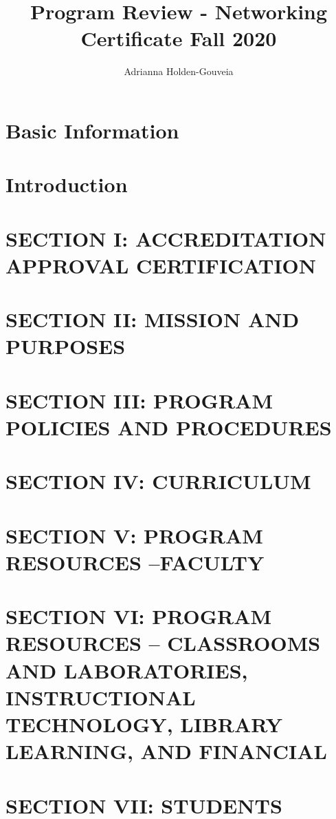 \documentclass[12pt,a4paper,man,natbib,donotrepeattitle, book]{apa6}
\title{Program Review - Networking Certificate Fall 2020}
\author{Adrianna Holden-Gouveia}
\affiliation{Northern Essex Community College}
\begin{document}
\maketitle
\doublespacing
\tableofcontents

\newpage
\section{Basic Information}



\section{Introduction}


\section{SECTION I: ACCREDITATION APPROVAL CERTIFICATION}
%

\section{SECTION II: MISSION AND PURPOSES}
%

\section{SECTION III: PROGRAM POLICIES AND PROCEDURES}
%

\section{SECTION IV: CURRICULUM}
%

\section{SECTION V: PROGRAM RESOURCES –FACULTY}
%

\section{SECTION VI: PROGRAM RESOURCES – CLASSROOMS AND LABORATORIES, INSTRUCTIONAL TECHNOLOGY, LIBRARY LEARNING, AND FINANCIAL}
%

\section{SECTION VII: STUDENTS}
%
\end{document}
